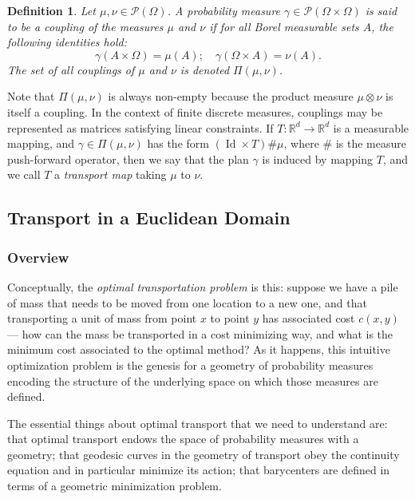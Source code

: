 \documentclass{article}
\DeclareMathOperator*{\Id}{Id}
\newtheorem{definition}{Definition}
\newcommand{\R}{\mathbb{R}}
\begin{document}
\begin{definition}
  Let \(\mu, \nu \in \mathcal{P}(\Omega)\). A probability measure \(\gamma \in \mathcal{P}(\Omega\times\Omega)\) is said to be a \emph{coupling} of the measures \(\mu\) and \(\nu\) if for all Borel measurable sets \(A\), the following identities hold:
\begin{equation*}
\gamma(A\times\Omega) = \mu(A); \quad \gamma(\Omega\times A) = \nu(A).
\end{equation*}
 The set of all couplings of \(\mu\) and \(\nu\) is denoted \(\Pi(\mu, \nu)\).
\end{definition}
Note that \(\Pi(\mu,\nu)\) is always non-empty because the product measure \(\mu \otimes \nu\) is itself a coupling. In the context of finite discrete measures, couplings may be represented as matrices satisfying linear constraints. If \(T: \R^d \to \R^d\) is a measurable mapping, and \(\gamma \in \Pi(\mu,\nu)\) has the form \((\Id \times T)\# \mu\), where \(\#\) is the measure push-forward operator, then we say that the plan \(\gamma\) is induced by mapping \(T\), and we call \(T\) a \emph{transport map} taking \(\mu\) to \(\nu\).

\subsection{Transport in a Euclidean Domain}
\label{OTSec}
\subsubsection{Overview}
Conceptually, the \emph{optimal transportation problem} is this: suppose we have a pile of mass that needs to be moved from one location to a new one, and that transporting a unit of mass from point \(x\) to point \(y\) has associated cost \(c(x,y)\) --- how can the mass be transported in a cost minimizing way, and what is the minimum cost associated to the optimal method? As it happens, this intuitive optimization problem is the genesis for a geometry of probability measures encoding the structure of the underlying space on which those measures are defined. 

The essential things about optimal transport that we need to understand are: that optimal transport endows the space of probability measures with a geometry; that geodesic curves in the geometry of transport obey the continuity equation and in particular minimize its action; that barycenters are defined in terms of a geometric minimization problem.
\end{document}
